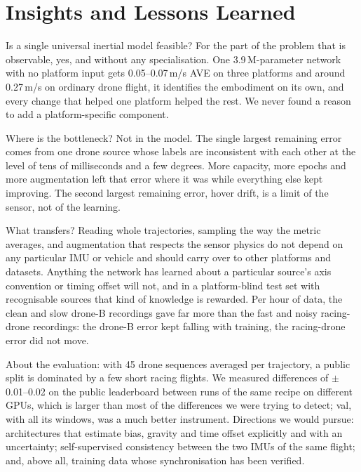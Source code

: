 \documentclass[letterpaper,10pt,conference]{ieeeconf}
\begin{document}
\section{Insights and Lessons Learned}
\label{sec:insights}
Is a single universal inertial model feasible? For the part of the problem that is observable, yes, and without any
specialisation. One 3.9\,M-parameter network with no platform input gets 0.05--0.07\,m/s AVE on three platforms and
around 0.27\,m/s on ordinary drone flight, it identifies the embodiment on its own, and every change that helped one
platform helped the rest. We never found a reason to add a platform-specific component.

Where is the bottleneck? Not in the model. The single largest remaining error comes from one drone source whose
labels are inconsistent with each other at the level of tens of milliseconds and a few degrees. More capacity, more
epochs and more augmentation left that error where it was while everything else kept improving. The second largest
remaining error, hover drift, is a limit of the sensor, not of the learning.

What transfers? Reading whole trajectories, sampling the way the metric averages, and augmentation that respects
the sensor physics do not depend on any particular IMU or vehicle and should carry over to other platforms and
datasets. Anything the network has learned about a particular source's axis convention or timing offset will not,
and in a platform-blind test set with recognisable sources that kind of knowledge is rewarded. Per hour of data,
the clean and slow drone-B recordings gave far more than the fast and noisy racing-drone recordings: the drone-B
error kept falling with training, the racing-drone error did not move.

About the evaluation: with 45 drone sequences averaged per trajectory, a public split is dominated by a few short
racing flights. We measured differences of $\pm$0.01--0.02 on the public leaderboard between runs of the same
recipe on different GPUs, which is larger than most of the differences we were trying to detect; val, with all its
windows, was a much better instrument. Directions we would pursue: architectures that estimate bias, gravity and
time offset explicitly and with an uncertainty; self-supervised consistency between the two IMUs of the same
flight; and, above all, training data whose synchronisation has been verified.
\end{document}
